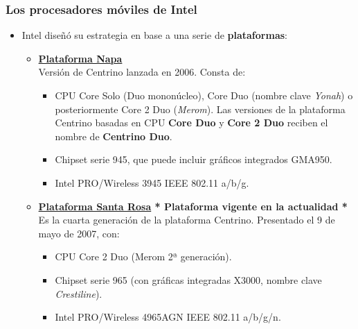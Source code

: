 \frame
{
\frametitle{Los procesadores móviles de Intel}
\begin{itemize}
 \item Intel diseñó su estrategia en base a una serie de \textbf{plataformas}:
	\begin{itemize}
	 \item \textbf{\underline{Plataforma Napa}}\\
	Versión de Centrino lanzada en 2006. Consta de:
		\begin{itemize}
		\item CPU Core Solo (Duo mononúcleo), Core Duo (nombre clave \textit{Yonah}) o posteriormente Core 2 Duo (\textit{Merom}). Las versiones de la plataforma Centrino basadas en CPU \textbf{Core Duo} y \textbf{Core 2 Duo} reciben el nombre de \textbf{Centrino Duo}.
		\item Chipset serie 945, que puede incluir gráficos integrados GMA950.
		\item Intel PRO/Wireless 3945 IEEE 802.11 a/b/g.
		\end{itemize}
	\end{itemize}

	\begin{itemize}
	 \item \textbf{\underline{Plataforma Santa Rosa} * Plataforma vigente en la actualidad *}\\
	Es la cuarta generación de la plataforma Centrino. Presentado el 9 de mayo de 2007, con:
		\begin{itemize}
		\item CPU Core 2 Duo (Merom 2ª generación).
		\item Chipset serie 965 (con gráficas integradas X3000, nombre clave \textit{Crestiline}).
		\item Intel PRO/Wireless 4965AGN IEEE 802.11 a/b/g/n.
		\end{itemize}
	\end{itemize}
\end{itemize}
}

